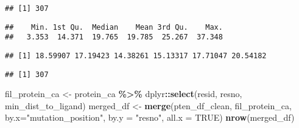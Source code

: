\documentclass[
]{article}
\newenvironment{Shaded}{\begin{snugshade}}{\end{snugshade}}
\newcommand{\AttributeTok}[1]{\textcolor[rgb]{0.13,0.29,0.53}{#1}}
\newcommand{\CommentTok}[1]{\textcolor[rgb]{0.56,0.35,0.01}{\textit{#1}}}
\newcommand{\ConstantTok}[1]{\textcolor[rgb]{0.56,0.35,0.01}{#1}}
\newcommand{\FunctionTok}[1]{\textcolor[rgb]{0.13,0.29,0.53}{\textbf{#1}}}
\newcommand{\NormalTok}[1]{#1}
\newcommand{\OtherTok}[1]{\textcolor[rgb]{0.56,0.35,0.01}{#1}}
\newcommand{\SpecialCharTok}[1]{\textcolor[rgb]{0.81,0.36,0.00}{\textbf{#1}}}
\newcommand{\StringTok}[1]{\textcolor[rgb]{0.31,0.60,0.02}{#1}}
\begin{document}
\begin{verbatim}
## [1] 307
\end{verbatim}

\begin{Shaded}
\end{Shaded}

\begin{verbatim}
##    Min. 1st Qu.  Median    Mean 3rd Qu.    Max. 
##   3.353  14.371  19.765  19.785  25.267  37.348
\end{verbatim}

\begin{Shaded}
\end{Shaded}

\begin{verbatim}
## [1] 18.59907 17.19423 14.38261 15.13317 17.71047 20.54182
\end{verbatim}

\begin{Shaded}
\end{Shaded}

\begin{verbatim}
## [1] 307
\end{verbatim}

\begin{Shaded}
\begin{Highlighting}[]
\NormalTok{fil\_protein\_ca }\OtherTok{\textless{}{-}}\NormalTok{ protein\_ca }\SpecialCharTok{\%\textgreater{}\%}\NormalTok{ dplyr}\SpecialCharTok{::}\FunctionTok{select}\NormalTok{(resid, resno, min\_dist\_to\_ligand)}
\NormalTok{merged\_df }\OtherTok{\textless{}{-}} \FunctionTok{merge}\NormalTok{(pten\_df\_clean, fil\_protein\_ca, }\AttributeTok{by.x=}\StringTok{"mutation\_position"}\NormalTok{, }\AttributeTok{by.y =} \StringTok{"resno"}\NormalTok{, }\AttributeTok{all.x =} \ConstantTok{TRUE}\NormalTok{)}
\FunctionTok{nrow}\NormalTok{(merged\_df)}
\end{Highlighting}
\end{Shaded}
\end{document}

